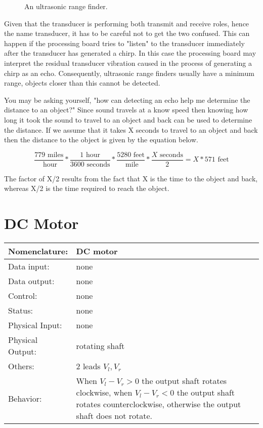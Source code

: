 \begin{figure}[ht]
\caption{An ultrasonic range finder.}
\label{fig:commonPeripheralComponentsultra}
\end{figure}

Given that the transducer is performing both transmit and receive
roles, hence the name transducer, it has to be careful not to get 
the two confused.  This can
happen if the processing board tries to "listen" to the transducer
immediately after the transducer has generated a chirp.  In this case
the processing board may interpret the residual transducer vibration
caused in the process of generating a chirp as an echo.  Consequently,
ultrasonic range finders 
usually have a minimum range, objects closer than this cannot be detected.

You may be asking yourself, "how can detecting an echo help me determine
the distance to an object?"  Since sound travels at a know speed
then knowing how long it took the sound to travel
to an object and back can be used to determine the distance.  If we assume
that it takes X seconds to travel to an object and back then the distance
to the object is given by the equation below.

$$	\frac{779 \text{ \ miles}}{\text{ \ hour}} * 
	\frac{1 \text{ \ hour}} {3600 \text{ \ seconds}} * 
	\frac{5280 \text{ \ feet}}{\text{ \ mile}} * 
	\frac{X \text{ \ seconds}}{2} =
	X * 571 \text{ \ feet} $$

The factor of X/2 results from the fact that X is the time to the 
object and back, whereas X/2 is the time required to reach the object. 




\section{DC Motor}
\label{page:dvmotor}
\begin{tabular}{|l|p{3.5in}|} \hline
Nomenclature:  & DC motor  \\ \hline
Data input:    & none    \\ \hline
Data output:   & none     \\ \hline
Control:       & none     \\ \hline
Status:        & none      \\ \hline
Physical Input:& none		\\ \hline
Physical Output:& rotating shaft		\\ \hline
Others:        & 2 leads $V_l, V_r$      \\ \hline
Behavior:      & When $V_l-V_r > 0$ the output shaft rotates clockwise, 
when $V_l-V_r < 0$ the output shaft rotates counterclockwise, otherwise the
output shaft does not rotate. \\ \hline
\end{tabular}

